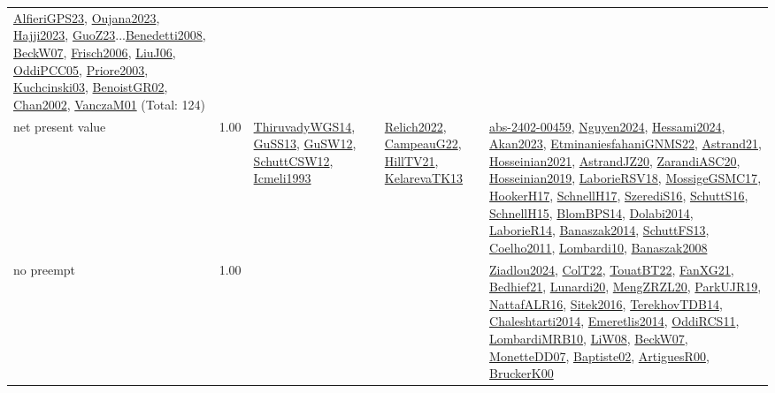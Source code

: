 {\begin{longtable}{p{3cm}r>{\raggedright\arraybackslash}p{6cm}>{\raggedright\arraybackslash}p{6cm}>{\raggedright\arraybackslash}p{8cm}}
\hyperref[detail:AlfieriGPS23]{AlfieriGPS23}, \hyperref[detail:Oujana2023]{Oujana2023}, \hyperref[detail:Hajji2023]{Hajji2023}, \hyperref[detail:GuoZ23]{GuoZ23}...\hyperref[detail:Benedetti2008]{Benedetti2008}, \hyperref[detail:BeckW07]{BeckW07}, \hyperref[detail:Frisch2006]{Frisch2006}, \hyperref[detail:LiuJ06]{LiuJ06}, \hyperref[detail:OddiPCC05]{OddiPCC05}, \hyperref[detail:Priore2003]{Priore2003}, \hyperref[detail:Kuchcinski03]{Kuchcinski03}, \hyperref[detail:BenoistGR02]{BenoistGR02}, \hyperref[detail:Chan2002]{Chan2002}, \hyperref[detail:VanczaM01]{VanczaM01} (Total: 124)\\
\index{net present value}\index{Concepts!net present value}net present value &  1.00 & \hyperref[detail:ThiruvadyWGS14]{ThiruvadyWGS14}, \hyperref[detail:GuSS13]{GuSS13}, \hyperref[detail:GuSW12]{GuSW12}, \hyperref[detail:SchuttCSW12]{SchuttCSW12}, \hyperref[detail:Icmeli1993]{Icmeli1993} & \hyperref[detail:Relich2022]{Relich2022}, \hyperref[detail:CampeauG22]{CampeauG22}, \hyperref[detail:HillTV21]{HillTV21}, \hyperref[detail:KelarevaTK13]{KelarevaTK13} & \hyperref[detail:abs-2402-00459]{abs-2402-00459}, \hyperref[detail:Nguyen2024]{Nguyen2024}, \hyperref[detail:Hessami2024]{Hessami2024}, \hyperref[detail:Akan2023]{Akan2023}, \hyperref[detail:EtminaniesfahaniGNMS22]{EtminaniesfahaniGNMS22}, \hyperref[detail:Astrand21]{Astrand21}, \hyperref[detail:Hosseinian2021]{Hosseinian2021}, \hyperref[detail:AstrandJZ20]{AstrandJZ20}, \hyperref[detail:ZarandiASC20]{ZarandiASC20}, \hyperref[detail:Hosseinian2019]{Hosseinian2019}, \hyperref[detail:LaborieRSV18]{LaborieRSV18}, \hyperref[detail:MossigeGSMC17]{MossigeGSMC17}, \hyperref[detail:HookerH17]{HookerH17}, \hyperref[detail:SchnellH17]{SchnellH17}, \hyperref[detail:SzerediS16]{SzerediS16}, \hyperref[detail:SchuttS16]{SchuttS16}, \hyperref[detail:SchnellH15]{SchnellH15}, \hyperref[detail:BlomBPS14]{BlomBPS14}, \hyperref[detail:Dolabi2014]{Dolabi2014}, \hyperref[detail:LaborieR14]{LaborieR14}, \hyperref[detail:Banaszak2014]{Banaszak2014}, \hyperref[detail:SchuttFS13]{SchuttFS13}, \hyperref[detail:Coelho2011]{Coelho2011}, \hyperref[detail:Lombardi10]{Lombardi10}, \hyperref[detail:Banaszak2008]{Banaszak2008}\\
\index{no preempt}\index{Concepts!no preempt}no preempt &  1.00 &  &  & \hyperref[detail:Ziadlou2024]{Ziadlou2024}, \hyperref[detail:ColT22]{ColT22}, \hyperref[detail:TouatBT22]{TouatBT22}, \hyperref[detail:FanXG21]{FanXG21}, \hyperref[detail:Bedhief21]{Bedhief21}, \hyperref[detail:Lunardi20]{Lunardi20}, \hyperref[detail:MengZRZL20]{MengZRZL20}, \hyperref[detail:ParkUJR19]{ParkUJR19}, \hyperref[detail:NattafALR16]{NattafALR16}, \hyperref[detail:Sitek2016]{Sitek2016}, \hyperref[detail:TerekhovTDB14]{TerekhovTDB14}, \hyperref[detail:Chaleshtarti2014]{Chaleshtarti2014}, \hyperref[detail:Emeretlis2014]{Emeretlis2014}, \hyperref[detail:OddiRCS11]{OddiRCS11}, \hyperref[detail:LombardiMRB10]{LombardiMRB10}, \hyperref[detail:LiW08]{LiW08}, \hyperref[detail:BeckW07]{BeckW07}, \hyperref[detail:MonetteDD07]{MonetteDD07}, \hyperref[detail:Baptiste02]{Baptiste02}, \hyperref[detail:ArtiguesR00]{ArtiguesR00}, \hyperref[detail:BruckerK00]{BruckerK00}\\

\end{longtable}}
